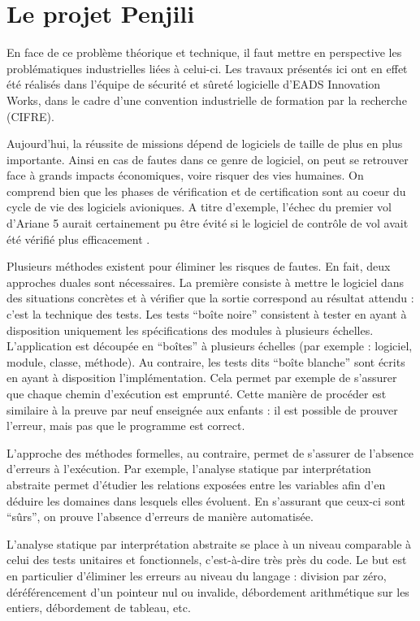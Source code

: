 \section{Le projet Penjili}

En face de ce problème théorique et technique, il faut mettre en perspective les
problématiques industrielles liées à celui-ci. Les travaux présentés ici ont en
effet été réalisés dans l'équipe de sécurité et sûreté logicielle d'EADS
Innovation Works, dans le cadre d'une convention industrielle de formation par
la recherche (CIFRE).

Aujourd'hui, la réussite de missions dépend de logiciels de taille de plus en
plus importante. Ainsi en cas de fautes dans ce genre de logiciel, on peut se
retrouver face à grands impacts économiques, voire risquer des vies humaines. On
comprend bien que les phases de vérification et de certification sont au coeur
du cycle de vie des logiciels avioniques. A titre d'exemple, l'échec du premier
vol d'Ariane 5 aurait certainement pu être évité si le logiciel de contrôle de
vol avait été vérifié plus efficacement \cite{Ariane501}.

Plusieurs méthodes existent pour éliminer les risques de fautes. En fait, deux
approches duales sont nécessaires. La première consiste à mettre le logiciel
dans des situations concrètes et à vérifier que la sortie correspond au résultat
attendu : c'est la technique des tests.  Les tests \enquote{boîte noire}
consistent à tester en ayant à disposition uniquement les spécifications des
modules à plusieurs échelles. L'application est découpée en \enquote{boîtes} à
plusieurs échelles (par exemple : logiciel, module, classe, méthode). Au
contraire, les tests dits \enquote{boîte blanche} sont écrits en ayant à
disposition l'implémentation. Cela permet par exemple de s'assurer que chaque
chemin d'exécution est emprunté. Cette manière de procéder est similaire à la
preuve par neuf enseignée aux enfants : il est possible de prouver l'erreur,
mais pas que le programme est correct.

L'approche des méthodes formelles, au contraire, permet de s'assurer de
l'absence d'erreurs à l'exécution. Par exemple, l'analyse statique par
interprétation abstraite permet d'étudier les relations exposées entre les
variables afin d'en déduire les domaines dans lesquels elles évoluent. En
s'assurant que ceux-ci sont \enquote{sûrs}, on prouve l'absence d'erreurs de
manière automatisée.

L'analyse statique par interprétation abstraite se place à un niveau comparable
à celui des tests unitaires et fonctionnels, c'est-à-dire très près du code. Le
but est en particulier d'éliminer les erreurs au niveau du langage : division
par zéro, déréférencement d'un pointeur nul ou invalide, débordement
arithmétique sur les entiers, débordement de tableau, etc.

